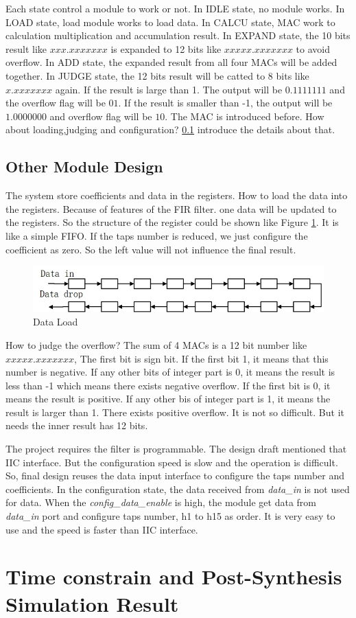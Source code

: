 \documentclass[a4paper]{article}
\begin{document}
Each state control a module to work or not. In IDLE state, no module works. In LOAD state, load module works to load data. In CALCU state, MAC work to calculation multiplication and accumulation result. In EXPAND state, the 10 bits result like $xxx.xxxxxxx$ is expanded to 12 bits like $xxxxx.xxxxxxx$ to avoid overflow. In ADD state, the expanded result from all four MACs will be added together. In JUDGE state, the 12 bits result will be catted to 8 bits like $x.xxxxxxx$ again. If the result is large than 1. The output will be $0.1111111$ and the overflow flag will be $01$. If the result is smaller than -1, the output will be $1.0000000$ and overflow flag will be $10$. The MAC is introduced before. How about loading,judging and configuration? \ref{subsec1_3} introduce the details about that.

\subsection{Other Module Design}\label{subsec1_3}
The system store coefficients and data in the registers. How to load the data into the registers. Because of features of the FIR filter. one data will be updated to the registers. So the structure of the register could be shown like Figure \ref{fig:load}. It is like a simple FIFO. If the taps number is reduced, we just configure the coefficient as zero. So the left value will not influence the final result.
\begin{figure}[htb]
	\centering
	\includegraphics[scale=0.6]{pic/load}
	\caption{Data Load}
	\label{fig:load}
\end{figure}

How to judge the overflow? The sum of 4 MACs is a 12 bit number like $xxxxx.xxxxxxx$, The first bit is sign bit. If the first bit 1, it means that this number is negative. If any other bits of integer part is 0, it means the result is less than -1 which means there exists negative overflow. If the first bit is 0, it means the result is positive. If any other bis of integer part is 1, it means the result is larger than 1. There exists positive overflow. It is not so difficult. But it needs the inner result has 12 bits.

The project requires the filter is programmable. The design draft mentioned that IIC interface. But the configuration speed is slow and the operation is difficult. So, final design reuses the data input interface to configure the taps number and coefficients. In the configuration state, the data received from \emph{data\_in} is not used for data. When the \emph{config\_data\_enable} is high, the module get data from \emph{data\_in} port and configure taps number, h1 to h15 as order.  It is very easy to use and the speed is faster than IIC interface. 
\section{Time constrain and Post-Synthesis Simulation Result} 
\end{document}
